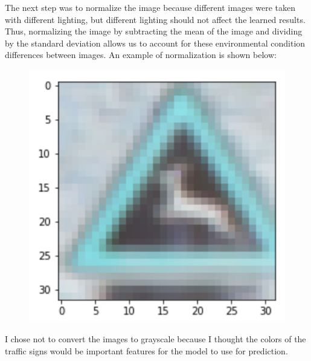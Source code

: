 \documentclass[12pt]{article}
\begin{document}
The next step was to normalize the image because different images were taken with different lighting, but different lighting should not affect the learned results. Thus, normalizing the image by subtracting the mean of the image and dividing by the standard deviation allows us to account for these environmental condition differences between images. An example of normalization is shown below:
\begin{figure}[!h]
\includegraphics[scale = 0.5]{writeup_images/normalized.png}
\end{figure}

I chose not to convert the images to grayscale because I thought the colors of the traffic signs would be important features for the model to use for prediction.
\end{document}
